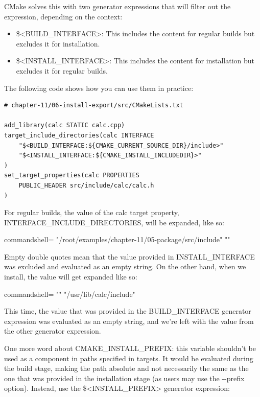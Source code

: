 CMake solves this with two generator expressions that will filter out the expression, depending on the context:

\begin{itemize}
\item 
\$<BUILD\_INTERFACE>: This includes the content for regular builds but excludes it for installation.

\item 
\$<INSTALL\_INTERFACE>: This includes the content for installation but excludes it for regular builds.
\end{itemize}

The following code shows how you can use them in practice:

\begin{lstlisting}[style=styleCMake]
# chapter-11/06-install-export/src/CMakeLists.txt

add_library(calc STATIC calc.cpp)
target_include_directories(calc INTERFACE
	"$<BUILD_INTERFACE:${CMAKE_CURRENT_SOURCE_DIR}/include>"
	"$<INSTALL_INTERFACE:${CMAKE_INSTALL_INCLUDEDIR}>"
)
set_target_properties(calc PROPERTIES
	PUBLIC_HEADER src/include/calc/calc.h
)
\end{lstlisting}

For regular builds, the value of the calc target property, INTERFACE\_INCLUDE\_DIRECTORIES, will be expanded, like so:

\begin{tcblisting}{commandshell={}}
"/root/examples/chapter-11/05-package/src/include" ""
\end{tcblisting}

Empty double quotes mean that the value provided in INSTALL\_INTERFACE was excluded and evaluated as an empty string. On the other hand, when we install, the value will get expanded like so:

\begin{tcblisting}{commandshell={}}
"" "/usr/lib/calc/include"
\end{tcblisting}

This time, the value that was provided in the BUILD\_INTERFACE generator expression was evaluated as an empty string, and we're left with the value from the other generator expression.

One more word about CMAKE\_INSTALL\_PREFIX: this variable shouldn't be used as a component in paths specified in targets. It would be evaluated during the build stage, making the path absolute and not necessarily the same as the one that was provided in the installation stage (as users may use the -{}-prefix option). Instead, use the \$<INSTALL\_PREFIX> generator expression:

